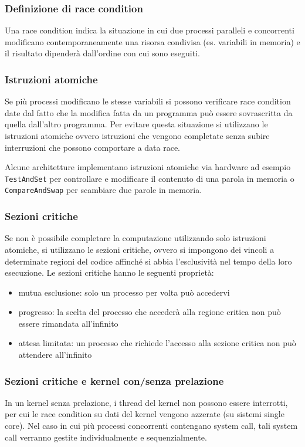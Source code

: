 \documentclass[a4paper]{article}
\begin{document}
\subsubsection*{Definizione di race condition}
Una race condition indica la situazione in cui due processi paralleli e concorrenti modificano contemporaneamente una risorsa
condivisa (es. variabili in memoria) e il risultato dipenderà dall'ordine con cui sono eseguiti.

\subsubsection*{Istruzioni atomiche}
Se più processi modificano le stesse variabili si possono verificare race condition date dal fatto che la modifica fatta da
un programma può essere sovrascritta da quella dall'altro programma. Per evitare questa situazione si utilizzano le istruzioni
atomiche ovvero istruzioni che vengono completate senza subire interruzioni che possono comportare a data race.

Alcune architetture implementano istruzioni atomiche via hardware ad esempio \verb|TestAndSet| per controllare e modificare il
contenuto di una parola in memoria o \verb|CompareAndSwap| per scambiare due parole in memoria.

\subsubsection*{Sezioni critiche}
Se non è possibile completare la computazione utilizzando solo istruzioni atomiche, si utilizzano le sezioni critiche, ovvero
si impongono dei vincoli a determinate regioni del codice affinché si abbia l'esclusività nel tempo della loro esecuzione. Le
sezioni critiche hanno le seguenti proprietà:
\begin{itemize}
	\item mutua esclusione: solo un processo per volta può accedervi
	\item progresso: la scelta del processo che accederà alla regione critica non può essere rimandata all'infinito
	\item attesa limitata: un processo che richiede l'accesso alla sezione critica non può attendere all'infinito
\end{itemize}

\subsubsection*{Sezioni critiche e kernel con/senza prelazione}
In un kernel senza prelazione, i thread del kernel non possono essere interrotti, per cui le race condition su dati del kernel
vengono azzerate (su sistemi single core). Nel caso in cui più processi concorrenti contengano system call, tali system call
verranno gestite individualmente e sequenzialmente.
\end{document}
